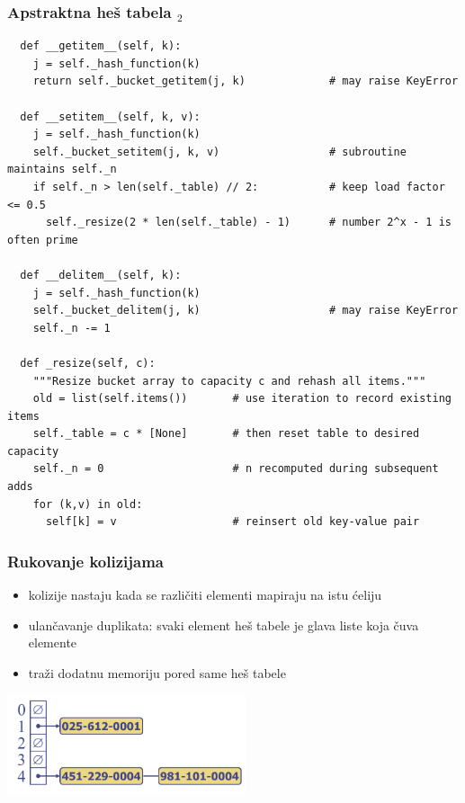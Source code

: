 \documentclass[compress]{beamer}
\begin{document}
\begin{frame}
  \frametitle{Apstraktna heš tabela $_2$}
\begin{verbatim}
  def __getitem__(self, k):
    j = self._hash_function(k)
    return self._bucket_getitem(j, k)             # may raise KeyError

  def __setitem__(self, k, v):
    j = self._hash_function(k)
    self._bucket_setitem(j, k, v)                 # subroutine maintains self._n
    if self._n > len(self._table) // 2:           # keep load factor <= 0.5
      self._resize(2 * len(self._table) - 1)      # number 2^x - 1 is often prime

  def __delitem__(self, k):
    j = self._hash_function(k)
    self._bucket_delitem(j, k)                    # may raise KeyError
    self._n -= 1

  def _resize(self, c):
    """Resize bucket array to capacity c and rehash all items."""
    old = list(self.items())       # use iteration to record existing items
    self._table = c * [None]       # then reset table to desired capacity
    self._n = 0                    # n recomputed during subsequent adds
    for (k,v) in old:
      self[k] = v                  # reinsert old key-value pair
\end{verbatim}
\end{frame}

\begin{frame}[fragile]
  \frametitle{Rukovanje kolizijama}
  \begin{itemize}
    \item kolizije nastaju kada se različiti elementi mapiraju na istu ćeliju
    \item ulančavanje duplikata: svaki element heš tabele je glava liste koja čuva elemente
    \item traži dodatnu memoriju pored same heš tabele
  \end{itemize}
  \begin{center}
    \includegraphics[width=7cm]{asp-10-pic08.png}
  \end{center}
\end{frame}
\end{document}

